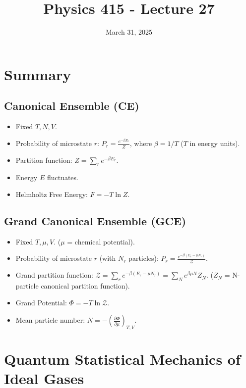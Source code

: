 \documentclass[11pt]{article}
\title{Physics 415 - Lecture 27}
\date{March 31, 2025}
\author{} %
\newcommand{\avg}[1]{\overline{#1}}
\newcommand{\pderiv}[2]{\frac{\partial #1}{\partial #2}}
\newcommand{\partfn}{Z} %
\newcommand{\grandpartfn}{\mathcal{Z}} %
\begin{document}
\maketitle
\thispagestyle{empty} %

\section*{Summary}

\subsection*{Canonical Ensemble (CE)}
\begin{itemize}
    \item Fixed $T, N, V$.
    \item Probability of microstate $r$: $P_r = \frac{e^{-\beta E_r}}{\partfn}$, where $\beta = 1/T$ ($T$ in energy units).
    \item Partition function: $\partfn = \sum_r e^{-\beta E_r}$.
    \item Energy $E$ fluctuates.
    \item Helmholtz Free Energy: $F = -T \ln \partfn$.
\end{itemize}

\subsection*{Grand Canonical Ensemble (GCE)}
\begin{itemize}
    \item Fixed $T, \mu, V$. ($\mu$ = chemical potential).
    \item Probability of microstate $r$ (with $N_r$ particles): $P_r = \frac{e^{-\beta(E_r - \mu N_r)}}{\grandpartfn}$.
    \item Grand partition function: $\grandpartfn = \sum_r e^{-\beta(E_r - \mu N_r)} = \sum_N e^{\beta \mu N} Z_N$.
    ($Z_N$ = N-particle canonical partition function).
    \item Grand Potential: $\Phi = -T \ln \grandpartfn$.
    \item Mean particle number: $\avg{N} = -\left( \pderiv{\Phi}{\mu} \right)_{T,V}$.
\end{itemize}

\section*{Quantum Statistical Mechanics of Ideal Gases}
\end{document}
